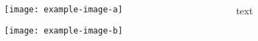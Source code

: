 \documentclass{beamer}
\begin{document}
\begin{frame}
\begin{columns}
\begin{column}{.45\textwidth}
\texttt{[image: example-image-a]}

\texttt{[image: example-image-b]}
\end{column}
\begin{column}{.45\textwidth}
text
\end{column}
\end{columns}
\end{frame} 
\end{document}
